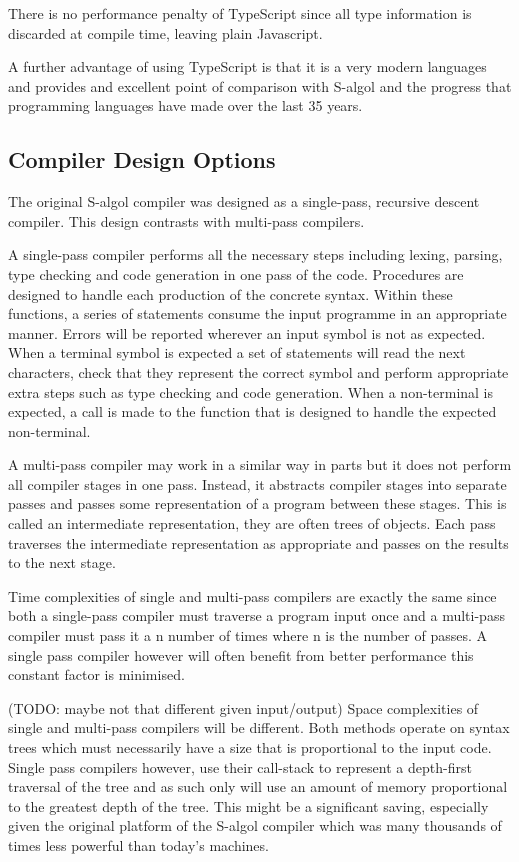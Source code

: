 \documentclass{article}
\begin{document}
There is no performance penalty of TypeScript since all type information is discarded at compile time, leaving plain Javascript.

A further advantage of using TypeScript is that it is a very modern languages and provides and excellent point of comparison with S-algol and the progress that programming languages have made over the last 35 years. 

\subsection{Compiler Design Options}

The original S-algol compiler was designed as a single-pass, recursive descent compiler. This design contrasts with multi-pass compilers.

A single-pass compiler performs all the necessary steps including lexing, parsing, type checking and code generation in one pass of the code. Procedures are designed to handle each production of the concrete syntax. Within these functions, a series of statements consume the input programme in an appropriate manner. Errors will be reported wherever an input symbol is not as expected. When a terminal symbol is expected a set of statements will read the next characters, check that they represent the correct symbol and perform appropriate extra steps such as type checking and code generation. When a non-terminal is expected, a call is made to the function that is designed to handle the expected non-terminal.

A multi-pass compiler may work in a similar way in parts but it does not perform all compiler stages in one pass. Instead, it abstracts compiler stages into separate passes and passes some representation of a program between these stages. This is called an intermediate representation, they are often trees of objects. Each pass traverses the intermediate representation as appropriate and passes on the results to the next stage.

Time complexities of single and multi-pass compilers are exactly the same since both a single-pass compiler must traverse a program input once and a multi-pass compiler must pass it a n number of times where n is the number of passes. A single pass compiler however will often benefit from better performance this constant factor is minimised.

(TODO: maybe not that different given input/output) Space complexities of single and multi-pass compilers will be different. Both methods operate on syntax trees which must necessarily have a size that is proportional to the input code. Single pass compilers however, use their call-stack to represent a depth-first traversal of the tree and as such only will use an amount of memory proportional to the greatest depth of the tree. This might be a significant saving, especially given the original platform of the S-algol compiler which was many thousands of times less powerful than today's machines.
\end{document}
